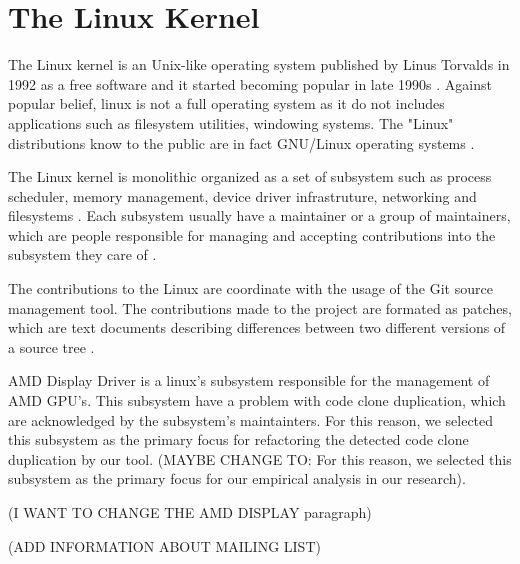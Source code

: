 \en

\section{The Linux Kernel}

The Linux kernel is an Unix-like operating system published by Linus Torvalds in 1992 as a free software and
it started becoming popular in late 1990s \citep{linuxbook}. Against popular belief, linux is not a full 
operating system as it do not includes applications such as filesystem utilities, windowing systems. The "Linux" 
distributions know to the public are in fact GNU/Linux operating systems \citep{gnuref}.

The Linux kernel is monolithic organized as a set of subsystem such as process scheduler, memory management, 
device driver infrastruture, networking and filesystems \citep{melissa}.
Each subsystem usually have a maintainer or a group of maintainers, which are people responsible 
for managing and accepting contributions into the subsystem they care of \citep{melissa}. 

The contributions to the Linux are coordinate with the usage of the Git source management tool. The contributions 
made to the project are formated as patches, which are text documents describing differences between two different 
versions of a source tree \citep{melissa}.

AMD Display Driver is a linux's subsystem responsible for the management of AMD GPU's. This subsystem have a problem 
with code clone duplication, which are acknowledged by the subsystem's maintainters. For this reason, we selected this
subsystem as the primary focus for refactoring the detected code clone duplication by our tool.
(MAYBE CHANGE TO: For this reason, we selected this subsystem as the primary focus for our empirical analysis in our research).

(I WANT TO CHANGE THE AMD DISPLAY paragraph)

(ADD INFORMATION ABOUT MAILING LIST)
